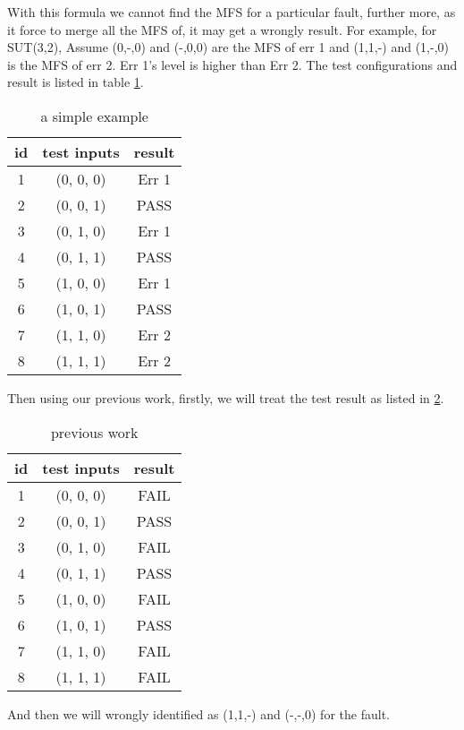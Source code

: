 \documentclass{sig-alternate}
\begin{document}
With this formula we cannot find the MFS for a particular fault, further more, as it force to merge all the MFS of, it may get a wrongly result. For example,
for SUT(3,2), Assume (0,-,0) and (-,0,0) are the MFS of err 1 and (1,1,-) and (1,-,0) is the MFS of err 2. Err 1's level is higher than Err 2. The test configurations and result is listed in table \ref{example_first_scenario}.

\begin{table}
\centering
\caption{a simple example}
\label{example_first_scenario}
\begin{tabular}{|c|c|c|} \hline
id&test inputs & result\\\hline
1&(0, 0, 0) &  Err 1\\ \hline
2&(0, 0, 1) &  PASS\\ \hline
3&(0, 1, 0) &  Err 1\\ \hline
4&(0, 1, 1) &  PASS\\ \hline
5&(1, 0, 0) &  Err 1\\ \hline
6&(1, 0, 1) &  PASS\\ \hline
7&(1, 1, 0) &  Err 2\\ \hline
8&(1, 1, 1) &  Err 2\\ \hline
\hline\end{tabular}
\end{table}

Then using our previous work, firstly, we will treat the test result as listed in \ref{previous_work}.

\begin{table}
\centering
\caption{previous work}
\label{previous_work}
\begin{tabular}{|c|c|c|} \hline
id&test inputs & result\\ \hline
1&(0, 0, 0) &  FAIL\\ \hline
2&(0, 0, 1) &  PASS\\ \hline
3&(0, 1, 0) &  FAIL\\ \hline
4&(0, 1, 1) &  PASS\\ \hline
5&(1, 0, 0) &  FAIL\\ \hline
6&(1, 0, 1) &  PASS\\ \hline
7&(1, 1, 0) &  FAIL\\ \hline
8&(1, 1, 1) &  FAIL\\ \hline
\hline\end{tabular}
\end{table}

And then we will wrongly identified as (1,1,-) and (-,-,0) for the fault.
\end{document}
